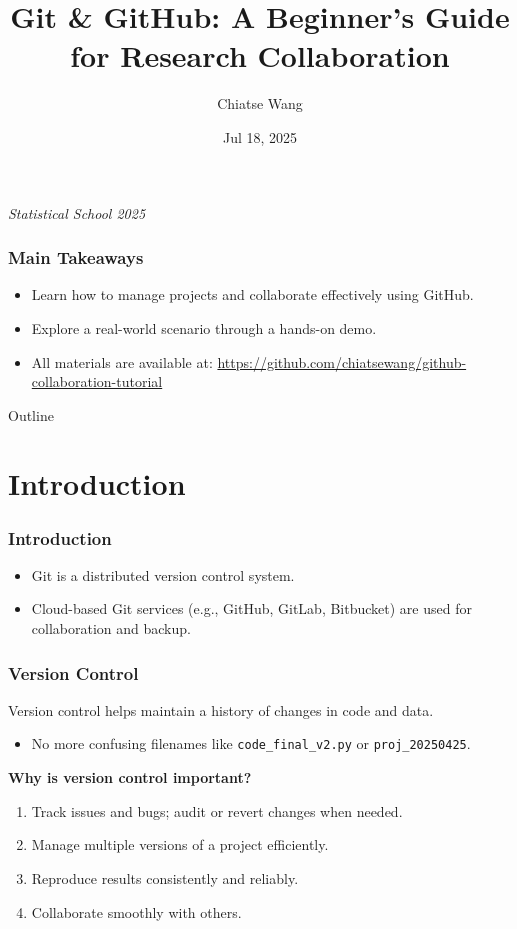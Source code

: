\documentclass[12pt]{beamer}
\title[Git Tutorial]{Git \& GitHub: A Beginner's Guide for Research Collaboration}
\author{Chiatse Wang}
\institute[ISS AS]{Institute of Statistical Science, Academia Sinica}
\date{Jul 18, 2025}
\begin{document}
\begin{frame}
  \titlepage
  \vfill
  \centering
  {\large \textit{Statistical School 2025}}

\end{frame}

\begin{frame}
  \frametitle{Main Takeaways}
  \begin{itemize}
    \setlength\itemsep{1em}
    \item Learn how to manage projects and collaborate effectively using GitHub.
    \item Explore a real-world scenario through a hands-on demo.
    \item All materials are available at: \url{https://github.com/chiatsewang/github-collaboration-tutorial}
  \end{itemize}
\end{frame}

\begin{frame}{Outline}
  \tableofcontents
\end{frame}

\section{Introduction}

\begin{frame}
  \frametitle{Introduction}
  \begin{itemize}
    \setlength\itemsep{1em}
    \item Git is a distributed version control system.
    \item Cloud-based Git services (e.g., GitHub, GitLab, Bitbucket) are used for collaboration and backup.
  \end{itemize}
\end{frame}

\begin{frame}
  \frametitle{Version Control}

  Version control helps maintain a history of changes in code and data.
  \begin{itemize}
    \setlength\itemsep{1em}
    \item No more confusing filenames like \texttt{code\_final\_v2.py} or \texttt{proj\_20250425}.
  \end{itemize}
  
  \vspace{1em}
  \textbf{Why is version control important?}
  \vspace{1em}

  \begin{enumerate}
    \setlength\itemsep{1em}
    \item Track issues and bugs; audit or revert changes when needed.
    \item Manage multiple versions of a project efficiently.
    \item Reproduce results consistently and reliably.
    \item Collaborate smoothly with others.
  \end{enumerate}
\end{frame}
\end{document}
